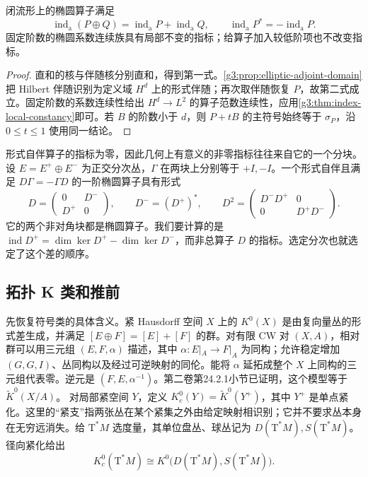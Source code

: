 \begin{proposition}\label{g3:prop:index-algebra}
	闭流形上的椭圆算子满足
	\[
		\operatorname{ind}_{\mathrm a}(P\oplus Q)
		=\operatorname{ind}_{\mathrm a}P+\operatorname{ind}_{\mathrm a}Q,
		\qquad
		\operatorname{ind}_{\mathrm a}P^*
		=-\operatorname{ind}_{\mathrm a}P.
	\]
	固定阶数的椭圆系数连续族具有局部不变的指标；给算子加入较低阶项也不改变指标。
\end{proposition}
\begin{proof}
	直和的核与伴随核分别直和，得到第一式。\cref{g3:prop:elliptic-adjoint-domain}把 Hilbert 伴随识别为定义域 \(H^d\) 上的形式伴随；再次取伴随恢复 \(P\)，故第二式成立。固定阶数的系数连续性给出 \(H^d\to L^2\) 的算子范数连续性，应用\cref{g3:thm:index-local-constancy}即可。若 \(B\) 的阶数小于 \(d\)，则 \(P+tB\) 的主符号始终等于 \(\sigma_P\)，沿 \(0\le t\le1\) 使用同一结论。
\end{proof}

形式自伴算子的指标为零，因此几何上有意义的非零指标往往来自它的一个分块。设 \(E=E^+\oplus E^-\) 为正交分次丛，\(\Gamma\) 在两块上分别等于 \(+I,-I\)。一个形式自伴且满足 \(D\Gamma=-\Gamma D\) 的一阶椭圆算子具有形式
\begin{equation}\label{g3:eq:odd-elliptic-block}
	D=\begin{pmatrix}0&D^-\\D^+&0\end{pmatrix},
	\qquad D^-=(D^+)^*,
	\qquad
	D^2=\begin{pmatrix}D^-D^+&0\\0&D^+D^-\end{pmatrix}.
\end{equation}
它的两个非对角块都是椭圆算子。我们要计算的是
\(\operatorname{ind}D^+=\dim\ker D^+-\dim\ker D^-\)，而非总算子 \(D\) 的指标。选定分次也就选定了这个差的顺序。

\subsection{拓扑 K 类和推前}
\label{g3:subsec:1704:02}
先恢复符号类的具体含义。紧 Hausdorff 空间 \(X\) 上的 \(K^0(X)\) 是由复向量丛的形式差生成，并满足 \([E\oplus F]=[E]+[F]\) 的群。对有限 CW 对 \((X,A)\)，相对群可以用三元组 \((E,F,\alpha)\) 描述，其中 \(\alpha:E|_A\to F|_A\) 为同构；允许稳定增加 \((G,G,I)\)、丛同构以及经过可逆映射的同伦。能将 \(\alpha\) 延拓成整个 \(X\) 上同构的三元组代表零。逆元是 \((F,E,\alpha^{-1})\)。第二卷第24.2.1小节已证明，这个模型等于 \(\widetilde K^0(X/A)\)。
\ProseParagraphBreak
对局部紧空间 \(Y\)，定义 \(K_c^0(Y)=\widetilde K^0(Y^+)\)，其中 \(Y^+\) 是单点紧化。这里的“紧支”指两张丛在某个紧集之外由给定映射相识别；它并不要求丛本身在无穷远消失。给 \(\mathrm T^*M\) 选度量，其单位盘丛、球丛记为 \(D(\mathrm T^*M),S(\mathrm T^*M)\)。径向紧化给出
\[
	K_c^0(\mathrm T^*M)
	\cong K^0\bigl(D(\mathrm T^*M),S(\mathrm T^*M)\bigr).
\]

